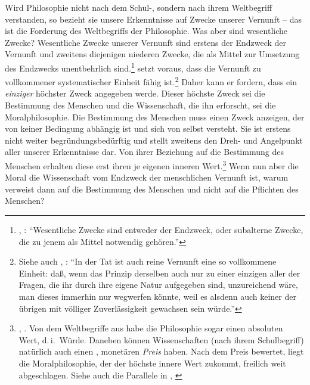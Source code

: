 Wird Philosophie nicht nach dem Schul-, sondern nach ihrem Weltbegriff
verstanden, so bezieht sie unsere Erkenntnisse auf  Zwecke
unserer Vernunft -- das ist die Forderung des Weltbegriffs der Philosophie. Was
aber sind wesentliche Zwecke? Wesentliche Zwecke unserer Vernunft sind erstens
der Endzweck der Vernunft und zweitens diejenigen niederen Zwecke, die als
Mittel zur Umsetzung des Endzwecks unentbehrlich
sind.\footnote{\label{Anmerkung:wesentlicheZwecke}\cite[Vgl.][B
868]{Kant:KritikderreinenVernunft2003}, \cite[III:
543.7--10]{Kant:GesammelteWerke1900ff.}: \enquote{Wesentliche Zwecke sind
\punkt{} entweder der Endzweck, oder subalterne Zwecke, die zu jenem als Mittel
notwendig gehören.}}  setzt voraus, dass die Vernunft zu vollkommener
systematischer Einheit fähig ist.\footnote{Siehe auch
\cite[A~xiii]{Kant:KritikderreinenVernunft2003}, \cite[IV:
10.11--16]{Kant:GesammelteWerke1900ff.}: \enquote{In der Tat ist auch reine
Vernunft eine so vollkommene Einheit: daß, wenn das Prinzip derselben auch nur
zu einer einzigen aller der Fragen, die ihr durch ihre eigene Natur aufgegeben
sind, unzureichend wäre, man dieses immerhin nur wegwerfen könnte, weil es
alsdenn auch keiner der übrigen mit völliger Zuverlässigkeit gewachsen sein
würde.}} Daher kann er fordern, dass ein \emph{einziger} höchster Zweck
angegeben werde. Dieser höchste Zweck sei die Bestimmung des Menschen und
die Wissenschaft, die ihn erforscht, sei die Moralphilosophie. Die Bestimmung
des Menschen muss einen Zweck anzeigen, der von keiner Bedingung abhängig ist
und sich von selbst versteht. Sie ist erstens nicht weiter begründungsbedürftig und stellt zweitens den Dreh- und
Angelpunkt aller unserer Erkenntnisse dar. Von ihrer Beziehung auf die
Bestimmung des Menschen erhalten diese erst ihren je eigenen inneren
Wert.\footnote{\cite[Vgl.][A 23]{Kant:ImmanuelKantsLogik1977}, \cite[IX:
23.33--24.2]{Kant:GesammelteWerke1900ff.}. Von dem Weltbegriffe aus habe die
Philosophie sogar einen absoluten Wert, d.\,i.\ Würde. Daneben können
Wissenschaften (nach ihrem Schulbegriff) natürlich auch einen ,
monetären \emph{Preis} haben. Nach dem Preis bewertet, liegt die
Moralphilosophie, der der höchste innere Wert zukommt, freilich weit abgeschlagen. 
Siehe auch die Parallele in \cite[][BA~77]{Kant:GrundlegungzurMetaphysikderSitten1965},
\cite[][IV: 434.31--435.4]{Kant:GesammelteWerke1900ff.}}
Wenn nun aber die Moral die Wissenschaft vom Endzweck der menschlichen
Vernunft ist, warum verweist  dann auf die Bestimmung des Menschen
und nicht auf die Pflichten des Menschen?

